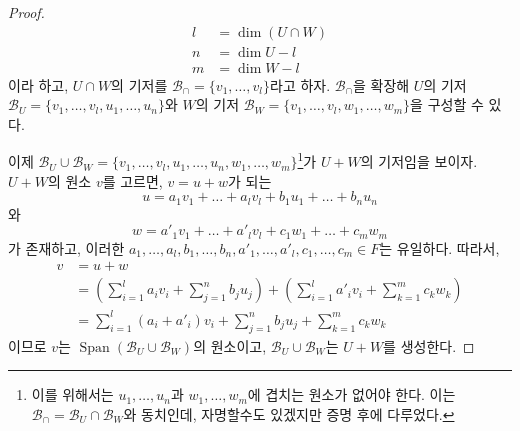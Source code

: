 \documentclass[unfonts,oneside,a4paper]{oblivoir}
\theoremstyle{definition}
\theoremstyle{theorem}
\theoremstyle{remark}
\theoremstyle{remark}
\theoremstyle{remark}
\theoremstyle{remark}
\renewcommand{\vec}[1]{\bm{\mathit{#1}}}
\DeclareMathOperator{\Span}{Span}
\begin{document}
\begin{proof}
    \begin{align*}
        l &= \dim (U \cap W)\\
        n &= \dim U - l\\
        m &= \dim W - l
    \end{align*}
    이라 하고, $U \cap W$의 기저를 $\mathcal B_\cap = \{\vec v_1, \dots, \vec v_l\}$라고 하자.
    $\mathcal B_\cap$을 확장해 $U$의 기저 $\mathcal B_U = \{\vec v_1, \dots, \vec v_l, \vec u_1, \dots, \vec u_n\}$와 $W$의 기저 $\mathcal B_W = \{\vec v_1, \dots, \vec v_l, \vec w_1, \dots, \vec w_m\}$을 구성할 수 있다.

    이제 $\mathcal B_U \cup \mathcal B_W = \{\vec v_1, \dots, \vec v_l, \vec u_1, \dots, \vec u_n, \vec w_1, \dots, \vec w_m\}$\footnote{이를 위해서는 $\vec u_1, \dots, \vec u_n$과 $\vec w_1, \dots, \vec w_m$에 겹치는 원소가 없어야 한다.
    이는 $\mathcal B_\cap = \mathcal B_U \cap \mathcal B_W$와 동치인데, 자명할수도 있겠지만 증명 후에 다루었다.}가 $U + W$의 기저임을 보이자.
    $U + W$의 원소 $\vec v$를 고르면, $\vec v = \vec u + \vec w$가 되는
    \[
        \vec u = a_1 \vec v_1 + \dots + a_l \vec v_l + b_1 \vec u_1 + \dots + b_n \vec u_n
    \]
    와
    \[
        \vec w = a'_1 \vec v_1 + \dots + a'_l \vec v_l + c_1 \vec w_1 + \dots + c_m \vec w_m
    \]
    가 존재하고, 이러한 $a_1, \dots, a_l, b_1, \dots, b_n, a'_1, \dots, a'_l, c_1, \dots, c_m \in F$는 유일하다.
    따라서,
    \begin{align*}
        \vec v &= \vec u + \vec w\\
               &= \left(\sum_{i = 1}^l a_i \vec v_i + \sum_{j = 1}^n b_j \vec u_j\right) + \left(\sum_{i = 1}^l a'_i \vec v_i + \sum_{k = 1}^m c_k \vec w_k\right)\\
               &= \sum_{i = 1}^l \left(a_i + a'_i\right) \vec v_i + \sum_{j = 1}^n b_j \vec u_j + \sum_{k = 1}^m c_k \vec w_k
    \end{align*}
    이므로 $\vec v$는 $\Span (\mathcal B_U \cup \mathcal B_W)$의 원소이고, $\mathcal B_U \cup \mathcal B_W$는 $U + W$를 생성한다.


\end{proof}
\end{document}
